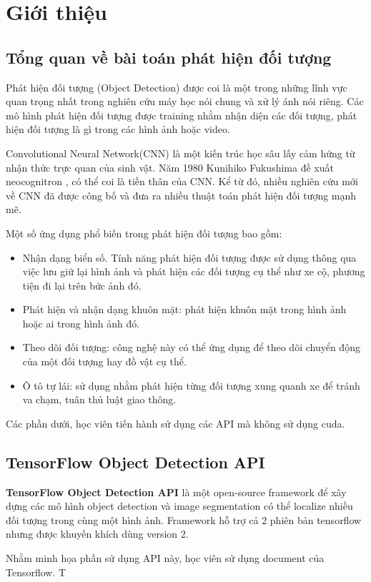 \section{Giới thiệu}
\label{sec:introduction}

\subsection{Tổng quan về bài toán phát hiện đối tượng}

Phát hiện đối tượng (Object Detection) được coi là một trong những lĩnh vực quan trọng nhất trong nghiên cứu máy học nói chung và xử lý ánh nói riêng. Các mô hình phát hiện đối tượng được training nhằm nhận diện các đối tượng, phát hiện đối tượng là gì trong các hình ảnh hoặc video.

Convolutional Neural Network(CNN) là một kiến trúc học sâu lấy cảm hứng từ nhận thức trực quan của sinh vật. Năm 1980 Kunihiko Fukushima\cite{fukushima1980self} đề xuất neocognitron , có thể coi là tiền thân của CNN. Kể từ đó, nhiều nghiên cứu mới về CNN đã được công bố và đưa ra nhiều thuật toán phát hiện đối tượng mạnh mẽ.

Một số ứng dụng phổ biến trong phát hiện đối tượng bao gồm:
\begin{itemize}
    \item Nhận dạng biển số. Tính năng phát hiện đối tượng được sử dụng thông qua việc lưu giữ lại hình ảnh và phát hiện các đối tượng cụ thể như xe cộ, phương tiện đi lại trên bức ảnh đó.
    \item Phát hiện và nhận dạng khuôn mặt: phát hiện khuôn mặt trong hình ảnh hoặc ai trong hình ảnh đó.
    \item Theo dõi đối tượng: công nghệ này có thể ứng dụng để theo dõi chuyển động của một đối tượng hay đồ vật cụ thể.
    \item Ô tô tự lái: sử dụng nhằm phát hiện từng đối tượng xung quanh xe để tránh va chạm, tuân thủ luật giao thông.
\end{itemize}

Các phần dưới, học viên tiến hành sử dụng các API mà không sử dụng cuda.

\subsection{TensorFlow Object Detection API}

\textbf{TensorFlow Object Detection API} là một open-source framework để xây dựng các mô hình object detection và image segmentation có thể localize nhiều đối tượng trong cùng một hình ảnh. Framework hỗ trợ cả 2 phiên bản tensorflow nhưng được khuyến khích dùng version 2.

Nhằm minh họa phần sử dụng API này, học viên sử dụng document của Tensorflow\cite{tensorflowapi}. T